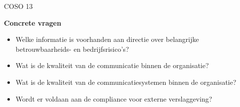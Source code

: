 COSO 13

\textbf{Concrete vragen}
\begin{itemize}
    \item Welke informatie is voorhanden aan directie over belangrijke betrouwbaarheids- en bedrijfsrisico's?
    \item Wat is de kwaliteit van de communicatie binnen de organisatie?
    \item Wat is de kwaliteit van de communicatiesystemen binnen de organisatie?
    \item Wordt er voldaan aan de compliance voor externe verslaggeving? 
\end{itemize}